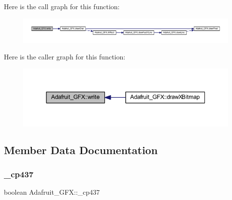 Here is the call graph for this function\+:\nopagebreak
\begin{figure}[H]
\begin{center}
\leavevmode
\includegraphics[width=350pt]{class_adafruit___g_f_x_af4978ea0cf0c0b0540567e82d8fa9900_cgraph}
\end{center}
\end{figure}
Here is the caller graph for this function\+:\nopagebreak
\begin{figure}[H]
\begin{center}
\leavevmode
\includegraphics[width=350pt]{class_adafruit___g_f_x_af4978ea0cf0c0b0540567e82d8fa9900_icgraph}
\end{center}
\end{figure}


\subsection{Member Data Documentation}
\mbox{\label{class_adafruit___g_f_x_aaef3d4d239641084cd3825a8b1042e01}} 
\subsubsection{\texorpdfstring{\+\_\+cp437}{\_cp437}}
{\footnotesize\ttfamily boolean Adafruit\+\_\+\+G\+F\+X\+::\+\_\+cp437\hspace{0.3cm}{\ttfamily [protected]}}

\mbox{\label{class_adafruit___g_f_x_ab9bb0cbc2455f64dce2a5ec36307aa94}} 
